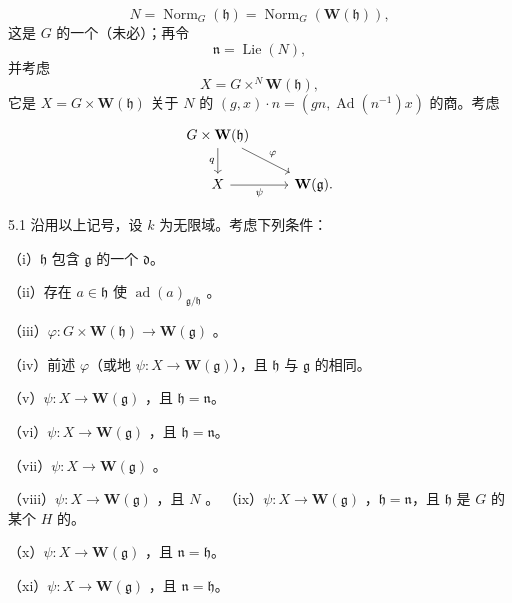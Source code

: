 \[N=\operatorname{Norm}_G(\mathfrak h)=\operatorname{Norm}_G(\mathbf W(\mathfrak h)),\]
这是 $G$ 的一个（未必）；再令
\[\mathfrak n=\operatorname{Lie}(N),\]
并考虑
\[X=G\times^N\mathbf W(\mathfrak h),\]
它是 $X=G\times\mathbf W(\mathfrak h)$ 关于 $N$ 的 $(g,x)\cdot n=(gn,\operatorname{Ad}(n^{-1})x)$ 的商。考虑
\[
\begin{tikzcd}
G\times\mathbf W(\mathfrak h)\arrow[d,"q"']\arrow[dr,"\varphi"]&\\
X\arrow[r,"\psi"']&\mathbf W(\mathfrak g).
\end{tikzcd}
\]
\begin{SGAresult}{}{5.1}
沿用以上记号，设 $k$ 为无限域。考虑下列条件：

（i）$\mathfrak h$ 包含 $\mathfrak g$ 的一个 $\mathfrak d$。

（ii）存在 $a\in\mathfrak h$ 使 $\operatorname{ad}(a)_{\mathfrak g/\mathfrak h}$ 。

（iii）$\varphi:G\times\mathbf W(\mathfrak h)\to\mathbf W(\mathfrak g)$ 。

（iv）前述 $\varphi$（或地 $\psi:X\to\mathbf W(\mathfrak g)$），且 $\mathfrak h$ 与 $\mathfrak g$ 的相同。

（v）$\psi:X\to\mathbf W(\mathfrak g)$ ，且 $\mathfrak h=\mathfrak n$。

（vi）$\psi:X\to\mathbf W(\mathfrak g)$ ，且 $\mathfrak h=\mathfrak n$。

（vii）$\psi:X\to\mathbf W(\mathfrak g)$ 。

（viii）$\psi:X\to\mathbf W(\mathfrak g)$ ，且 $N$ 。
（ix）$\psi:X\to\mathbf W(\mathfrak g)$ ，$\mathfrak h=\mathfrak n$，且 $\mathfrak h$ 是 $G$ 的某个 $H$ 的。

（x）$\psi:X\to\mathbf W(\mathfrak g)$ ，且 $\mathfrak n=\mathfrak h$。

（xi）$\psi:X\to\mathbf W(\mathfrak g)$ ，且 $\mathfrak n=\mathfrak h$。


\end{SGAresult}
